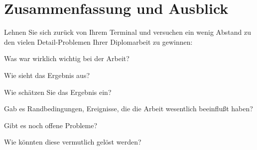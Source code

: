 
\chapter{Zusammenfassung und Ausblick} %

\label{ch:zusammenfassungUndAusblick} %


Lehnen Sie sich zurück von Ihrem Terminal und versuchen ein wenig Abstand zu
den vielen Detail-Problemen Ihrer Diplomarbeit zu gewinnen: 

Was war wirklich wichtig bei der Arbeit? 

Wie sieht das Ergebnis aus? 

Wie schätzen Sie das Ergebnis ein? 

Gab es Randbedingungen, Ereignisse, die die Arbeit wesentlich beeinflußt haben? 

Gibt es noch offene Probleme?

Wie könnten diese vermutlich gelöst werden?

